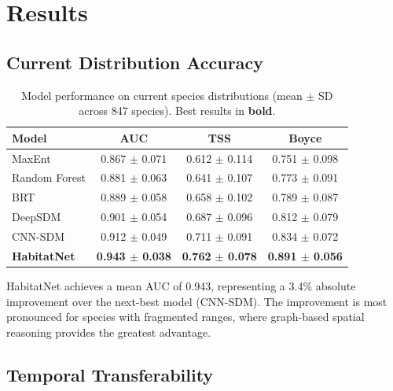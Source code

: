 \section{Results}

\label{sec:results}

\subsection{Current Distribution Accuracy}

\begin{table}[H]
\centering
\caption{Model performance on current species distributions (mean
$\pm$ SD across 847 species). Best results in \textbf{bold}.}
\label{tab:current}
\begin{tabular}{lccc}
\toprule
\textbf{Model} & \textbf{AUC} & \textbf{TSS} & \textbf{Boyce} \\
\midrule
MaxEnt          & 0.867 $\pm$ 0.071 & 0.612 $\pm$ 0.114 & 0.751 $\pm$ 0.098 \\
Random Forest   & 0.881 $\pm$ 0.063 & 0.641 $\pm$ 0.107 & 0.773 $\pm$ 0.091 \\
BRT             & 0.889 $\pm$ 0.058 & 0.658 $\pm$ 0.102 & 0.789 $\pm$ 0.087 \\
DeepSDM         & 0.901 $\pm$ 0.054 & 0.687 $\pm$ 0.096 & 0.812 $\pm$ 0.079 \\
CNN-SDM         & 0.912 $\pm$ 0.049 & 0.711 $\pm$ 0.091 & 0.834 $\pm$ 0.072 \\
\textbf{HabitatNet} & \textbf{0.943 $\pm$ 0.038} & \textbf{0.762 $\pm$ 0.078} & \textbf{0.891 $\pm$ 0.056} \\
\bottomrule
\end{tabular}
\end{table}

HabitatNet achieves a mean AUC of 0.943, representing a 3.4\% absolute
improvement over the next-best model (CNN-SDM). The improvement is most
pronounced for species with fragmented ranges, where graph-based spatial
reasoning provides the greatest advantage.

\subsection{Temporal Transferability}


